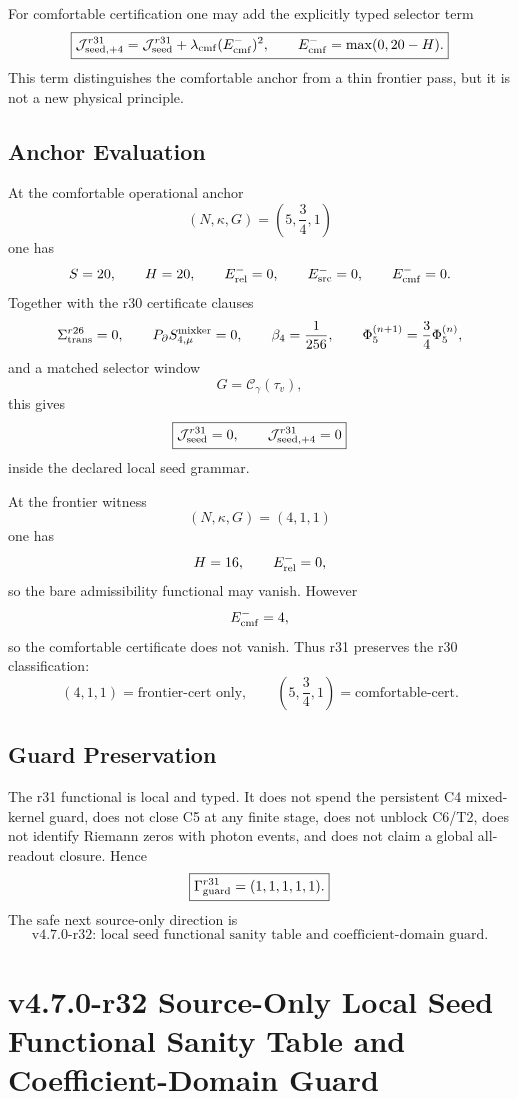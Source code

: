 For comfortable certification one may add the explicitly typed selector term
\[
\boxed{
\mathcal J_{{\rm seed},+4}^{r31}
=\mathcal J_{\rm seed}^{r31}
+\lambda_{\rm cmf}(E_{\rm cmf}^{-})^2,
\qquad
E_{\rm cmf}^{-}=\max(0,20-H).
}
\]
This term distinguishes the comfortable anchor from a thin frontier pass, but it
is not a new physical principle.

\subsection{Anchor Evaluation}
\label{subsec:r31-anchor-evaluation}

At the comfortable operational anchor
\[
(N,\kappa,G)=\left(5,\frac34,1\right)
\]
one has
\[
S=20,
\qquad
H=20,
\qquad
E_{\rm rel}^{-}=0,
\qquad
E_{\rm src}^{-}=0,
\qquad
E_{\rm cmf}^{-}=0.
\]
Together with the r30 certificate clauses
\[
\Sigma_{\rm trans}^{r26}=0,
\qquad
P_{\partial}S_{4,\mu}^{\rm mixker}=0,
\qquad
\beta_4=\frac1{256},
\qquad
\Phi_5^{(n+1)}=\frac34\Phi_5^{(n)},
\]
and a matched selector window
\[
G=\mathcal C_{\gamma}(\tau_v),
\]
this gives
\[
\boxed{
\mathcal J_{\rm seed}^{r31}=0,
\qquad
\mathcal J_{{\rm seed},+4}^{r31}=0
}
\]
inside the declared local seed grammar.

At the frontier witness
\[
(N,\kappa,G)=(4,1,1)
\]
one has
\[
H=16,
\qquad
E_{\rm rel}^{-}=0,
\]
so the bare admissibility functional may vanish.  However
\[
E_{\rm cmf}^{-}=4,
\]
so the comfortable certificate does not vanish.  Thus r31 preserves the r30
classification:
\[
\boxed{
(4,1,1)=\text{frontier-cert only},
\qquad
\left(5,\frac34,1\right)=\text{comfortable-cert}.
}
\]

\subsection{Guard Preservation}
\label{subsec:r31-guard-preservation}

The r31 functional is local and typed.  It does not spend the persistent C4
mixed-kernel guard, does not close C5 at any finite stage, does not unblock
C6/T2, does not identify Riemann zeros with photon events, and does not claim a
global all-readout closure.  Hence
\[
\boxed{
\Gamma_{\rm guard}^{r31}=(1,1,1,1,1).
}
\]
The safe next source-only direction is
\[
\boxed{
\text{v4.7.0-r32: local seed functional sanity table and coefficient-domain guard.}
}
\]



\section{v4.7.0-r32 Source-Only Local Seed Functional Sanity Table and Coefficient-Domain Guard}
\label{sec:v47-r32-seed-functional-sanity-domain}

